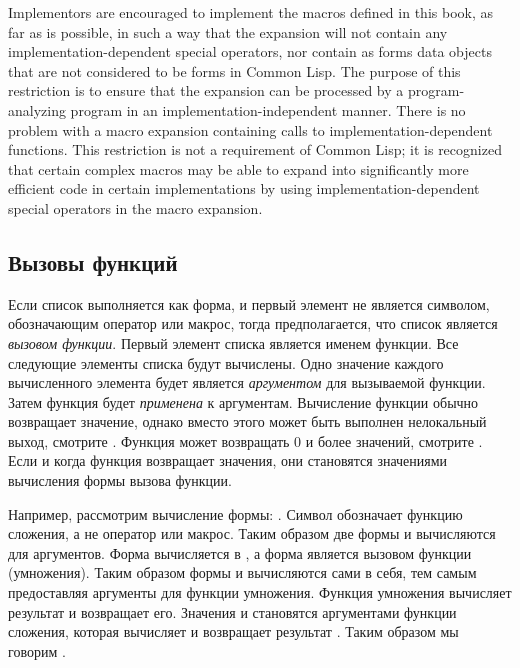 \beforenoterule
\begin{implementation}
Implementors are encouraged to implement the macros
defined in this book, as far as is possible, in such a way that
the expansion will not contain any implementation-dependent
special operators, nor contain as forms data objects that
are not considered to be forms in Common Lisp.
The purpose of this restriction is to ensure that the expansion
can be processed by a program-analyzing program in an
implementation-independent manner.
There is no problem with a macro expansion containing
calls to implementation-dependent functions.
This restriction is not a requirement of Common Lisp; it is recognized
that certain complex macros may be able to expand into significantly
more efficient code in certain implementations
by using implementation-dependent special operators in the macro expansion.
\end{implementation}
\afternoterule

\subsection{Вызовы функций}

Если список выполняется как форма, и первый элемент не является символом,
обозначающим оператор или макрос, тогда предполагается, что список
является \emph{вызовом функции}. Первый элемент списка является именем
функции. Все следующие элементы списка будут вычислены. Одно значение каждого
вычисленного элемента будет является \emph{аргументом} для вызываемой
функции. 
Затем функция будет \emph{применена} к аргументам. Вычисление функции обычно
возвращает значение, однако вместо этого может быть выполнен нелокальный выход,
смотрите . Функция может возвращать 0 и более значений, смотрите
. 
Если и когда функция возвращает значения, они становятся значениями вычисления
формы вызова функции.

Например, рассмотрим вычисление формы: .
Символ \cdf{+} обозначает функцию сложения, а не оператор или макрос.
Таким образом две формы  и  вычисляются для аргументов. Форма
 вычисляется в , а форма  является вызовом функции
(умножения). Таким образом формы  и  вычисляются сами в себя, тем
самым предоставляя аргументы для функции умножения. Функция умножения вычисляет
результат  и возвращает его. Значения  и  становятся
аргументами функции сложения, которая вычисляет и возвращает результат
. Таким образом мы говорим .

